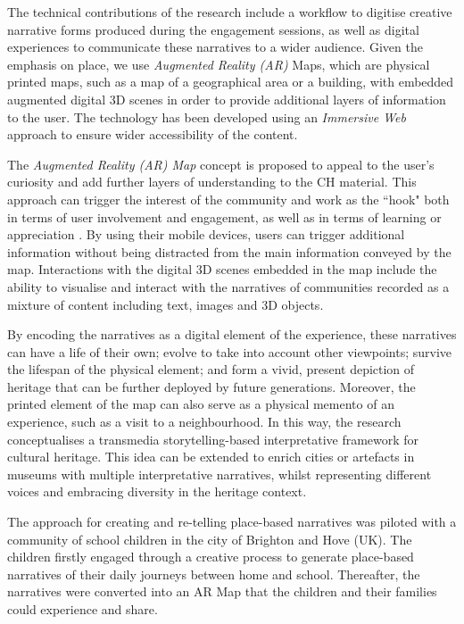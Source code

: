 \documentclass[acmlarge,screen,dvipsnames]{acmart}
\begin{document}
The technical contributions of the research include a workflow to digitise creative narrative forms produced during the engagement sessions, as well as digital experiences to communicate these narratives to a wider audience. Given the emphasis on place, we use \emph{Augmented Reality (AR)} Maps, which are physical printed
maps, such as a map of a geographical area or a building, with embedded augmented digital 3D scenes in order to provide additional layers of information to the user. The technology has been developed using an
\emph{Immersive Web} approach to ensure wider accessibility of the content.

The \emph{Augmented Reality (AR) Map} concept is proposed to appeal to the
user's curiosity and add further layers of understanding to the CH material. This approach can trigger the interest of the community and work as the ``hook" both in terms of user involvement and engagement, as well as in terms of learning or appreciation \cite{Csikszentmihalyi1995}. By using their mobile devices, users can trigger additional
information without being distracted from the main information conveyed by the
map. Interactions with the digital 3D scenes embedded in the map include
the ability to visualise and interact with the narratives of communities
recorded as a mixture of content including text, images and 3D objects.    

By encoding the narratives as a digital element of the experience, these
narratives can have a life of their own; evolve to take into account
other viewpoints; survive the lifespan of the physical element; and form
a vivid, present depiction of heritage that can be further deployed by future
generations. Moreover, the printed element of the map can also serve as a physical
memento of an experience, such as a visit to a neighbourhood. In this
way, the research conceptualises a transmedia storytelling-based
interpretative framework for cultural heritage. This idea can be
extended to enrich cities or artefacts in museums with multiple
interpretative narratives, whilst representing different voices and embracing
diversity in the heritage context.

The approach for creating and re-telling place-based narratives was
piloted with a community of school children in the city of Brighton and
Hove (UK). The children firstly engaged through a creative process to generate place-based narratives of their
daily journeys between home and school. Thereafter, the narratives were
converted into an AR Map that the children and their families could
experience and share.
\end{document}

